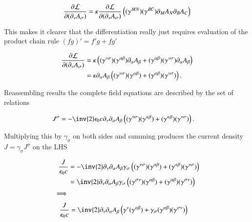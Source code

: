 \documentclass{article}
\begin{document}
\begin{align*}
\frac{\partial {\mathcal{L}}}{\partial {(\partial_\nu A_\sigma)}} 
&= \kappa \frac{\partial {\mathcal{L}}}{\partial {(\partial_\nu A_\sigma)}} \left( (\gamma^{M N}) (\gamma^{B C}) \partial_M A_N \partial_B A_C \right) \\
\end{align*}

This makes it clearer that the differentiation really just requires evaluation of the product chain rule $(fg)' = f'g + f g'$

\begin{align*}
\frac{\partial {\mathcal{L}}}{\partial {(\partial_\nu A_\sigma)}} 
&=
\kappa
\left(
(\gamma^{\nu\sigma}) (\gamma^{\alpha\beta}) \partial_\alpha A_\beta 
+(\gamma^{\alpha\beta}) (\gamma^{\nu\sigma}) \partial_\alpha A_\beta
\right) \\
&= \kappa \partial_\alpha A_\beta \left( (\gamma^{\nu\sigma}) (\gamma^{\alpha\beta}) +(\gamma^{\alpha\beta}) (\gamma^{\nu\sigma}) \right).
\end{align*}


Reassembling results the complete field equations are described by the set of relations

\begin{align*}
J^\sigma
&= -\inv{2} \epsilon_0 c \partial_\nu \partial_\alpha A_\beta
\left( (\gamma^{\nu\sigma}) (\gamma^{\alpha\beta}) +(\gamma^{\alpha\beta}) (\gamma^{\nu\sigma}) \right).
\end{align*}

Multiplying this by $\gamma_\sigma$ on both sides and summing produces the current density $J = \gamma_\sigma J^\sigma$ on the LHS

\begin{align*}
\frac{J}{\epsilon_0 c}
&= -\inv{2}
\partial_\nu \partial_\alpha A_\beta
\gamma_\sigma
\left( (\gamma^{\nu\sigma}) (\gamma^{\alpha\beta}) +(\gamma^{\alpha\beta}) (\gamma^{\nu\sigma}) \right) \\
&= \inv{2}
\partial_\nu \partial_\alpha A_\beta
\gamma_\sigma
\left( (\gamma^{\sigma\nu}) (\gamma^{\alpha\beta}) +(\gamma^{\alpha\beta}) (\gamma^{\sigma\nu}) \right) \\
\implies \\
\end{align*}
\begin{align}\label{eqn:gettingthere}
\frac{J}{\epsilon_0 c}
&= \inv{2}
\partial_\nu \partial_\alpha A_\beta
\left(
\gamma^{\nu} (\gamma^{\alpha\beta}) +
\gamma_\sigma (\gamma^{\alpha\beta}) (\gamma^{\sigma\nu})
\right)
\end{align}
\end{document}
